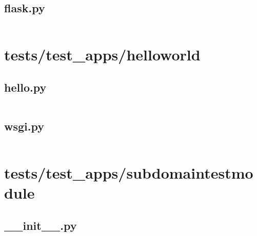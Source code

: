 \documentclass{article}
\begin{document}
\subsection{flask.py}
\inputminted{python}{/tmp/flask/tests/test_apps/cliapp/inner1/inner2/flask.py}
\newpage

\section{tests/test\_apps/helloworld}

\subsection{hello.py}
\inputminted{python}{/tmp/flask/tests/test_apps/helloworld/hello.py}
\newpage

\subsection{wsgi.py}
\inputminted{python}{/tmp/flask/tests/test_apps/helloworld/wsgi.py}
\newpage

\section{tests/test\_apps/subdomaintestmodule}

\subsection{\_\_init\_\_.py}
\inputminted{python}{/tmp/flask/tests/test_apps/subdomaintestmodule/__init__.py}
\newpage


\end{document}
